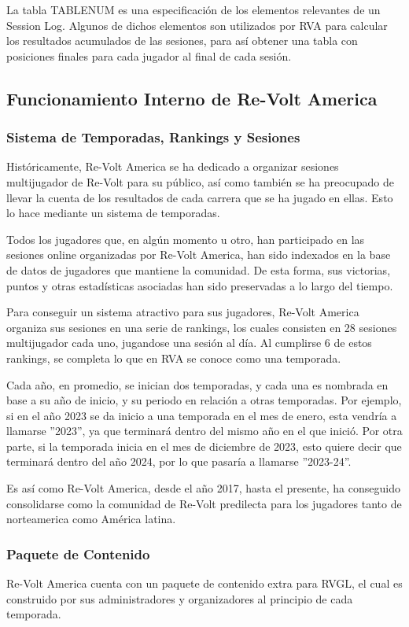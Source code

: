 La tabla TABLENUM es una especificación de los elementos relevantes de un Session Log. Algunos de dichos elementos son utilizados por RVA para calcular los resultados acumulados de las sesiones, para así obtener una tabla con posiciones finales para cada jugador al final de cada sesión.

\subsection{Funcionamiento Interno de Re-Volt America}

\subsubsection{Sistema de Temporadas, Rankings y Sesiones}
Históricamente, Re-Volt America se ha dedicado a organizar sesiones multijugador de Re-Volt para su público, así como también se ha preocupado de llevar la cuenta de los resultados de cada carrera que se ha jugado en ellas. Esto lo hace mediante un sistema de temporadas.

Todos los jugadores que, en algún momento u otro, han participado en las sesiones online organizadas por Re-Volt America, han sido indexados en la base de datos de jugadores que mantiene la comunidad. De esta forma, sus victorias, puntos y otras estadísticas asociadas han sido preservadas a lo largo del tiempo.

Para conseguir un sistema atractivo para sus jugadores, Re-Volt America organiza sus sesiones en una serie de rankings, los cuales consisten en 28 sesiones multijugador cada uno, jugandose una sesión al día. Al cumplirse 6 de estos rankings, se completa lo que en RVA se conoce como una temporada.

Cada año, en promedio, se inician dos temporadas, y cada una es nombrada en base a su año de inicio, y su periodo en relación a otras temporadas. Por ejemplo, si en el año 2023 se da inicio a una temporada en el mes de enero, esta vendría a llamarse ''2023'', ya que terminará dentro del mismo año en el que inició. Por otra parte, si la temporada inicia en el mes de diciembre de 2023, esto quiere decir que terminará dentro del año 2024, por lo que pasaría a llamarse ''2023-24''.

Es así como Re-Volt America, desde el año 2017, hasta el presente, ha conseguido consolidarse como la comunidad de Re-Volt predilecta para los jugadores tanto de norteamerica como América latina.

\subsubsection{Paquete de Contenido}
Re-Volt America cuenta con un paquete de contenido extra para RVGL, el cual es construido por sus administradores y organizadores al principio de cada temporada.

